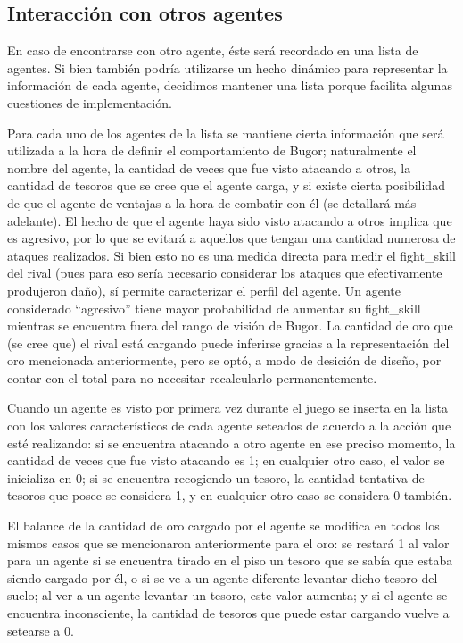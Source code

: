 \documentclass[a4paper,10pt,spanish]{article}
\begin{document}
	\subsection{Interacci\'on con otros agentes}
	
	En caso de encontrarse con otro agente, \'este ser\'a recordado en una lista de agentes. Si bien tambi\'en podr\'ia utilizarse un hecho din\'amico para representar la informaci\'on de cada agente, decidimos mantener una lista porque facilita algunas cuestiones de implementaci\'on.
	
	Para cada uno de los agentes de la lista se mantiene cierta informaci\'on que ser\'a utilizada a la hora de definir el comportamiento de Bugor; naturalmente el nombre del agente, la cantidad de veces que fue visto atacando a otros, la cantidad de tesoros que se cree que el agente carga, y si existe cierta posibilidad de que el agente de ventajas a la hora de combatir con \'el (se detallar\'a m\'as adelante). El hecho de que el agente haya sido visto atacando a otros implica que es agresivo, por lo que se evitar\'a a aquellos que tengan una cantidad numerosa de ataques realizados. Si bien esto no es una medida directa para medir el fight\_skill del rival (pues para eso ser\'ia necesario considerar los ataques que efectivamente produjeron da\~no), s\'i permite caracterizar el perfil del agente. Un agente considerado ``agresivo'' tiene mayor probabilidad de aumentar su fight\_skill mientras se encuentra fuera del rango de visi\'on de Bugor. La cantidad de oro que (se cree que) el rival est\'a cargando puede inferirse gracias a la representaci\'on del oro mencionada anteriormente, pero se opt\'o, a modo de desici\'on de dise\~no, por contar con el total para no necesitar recalcularlo permanentemente.
	
	Cuando un agente es visto por primera vez durante el juego se inserta en la lista con los valores caracter\'isticos de cada agente seteados de acuerdo a la acci\'on que est\'e realizando: si se encuentra atacando a otro agente en ese preciso momento, la cantidad de veces que fue visto atacando es 1; en cualquier otro caso, el valor se inicializa en 0; si se encuentra recogiendo un tesoro, la cantidad tentativa de tesoros que posee se considera 1, y en cualquier otro caso se considera 0 tambi\'en.
	
	El balance de la cantidad de oro cargado por el agente se modifica en todos los mismos casos que se mencionaron anteriormente para el oro: se restar\'a 1 al valor para un agente si se encuentra tirado en el piso un tesoro que se sab\'ia que estaba siendo cargado por \'el, o si se ve a un agente diferente levantar dicho tesoro del suelo; al ver a un agente levantar un tesoro, este valor aumenta; y si el agente se encuentra inconsciente, la cantidad de tesoros que puede estar cargando vuelve a setearse a 0.
	
\end{document}
